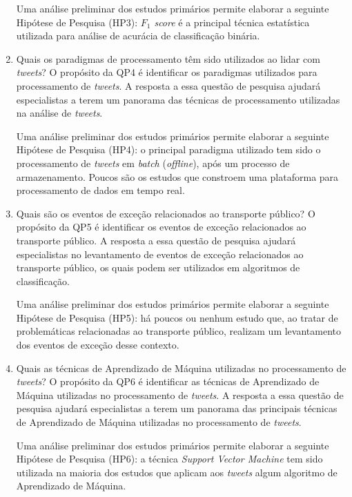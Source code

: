 \documentclass[
	12pt,				%
	oneside,			%
	a4paper,			%
	english,			%
	brazil				%
	]{abntex2ppgsi}
\begin{document}
\begin{enumerate}
Uma análise preliminar dos estudos primários permite elaborar a seguinte Hipótese de Pesquisa (HP3): \textit{${F_1}$ score} é a principal técnica estatística utilizada para análise de acurácia de classificação binária.\newline

\item Quais os paradigmas de processamento têm sido utilizados ao lidar com \textit{tweets}?
\label{item:4} \newline \newline
O propósito da QP4 é identificar os paradigmas utilizados para processamento de \textit{tweets}. A resposta a essa questão de pesquisa ajudará especialistas a terem um panorama das técnicas de processamento utilizadas na análise de \textit{tweets}. \newline

Uma análise preliminar dos estudos primários permite elaborar a seguinte Hipótese de Pesquisa (HP4): o principal paradigma utilizado tem sido o processamento de \textit{tweets} em \textit{batch} (\textit{offline}), após um processo de armazenamento. Poucos são os estudos que constroem uma plataforma para processamento de dados em tempo real. \newline

\item Quais são os eventos de exceção relacionados ao transporte público?
\label{item:5} \newline \newline
O propósito da QP5 é identificar os eventos de exceção relacionados ao transporte público. A resposta a essa questão de pesquisa ajudará especialistas no levantamento de eventos de exceção relacionados ao transporte público, os quais podem ser utilizados em algoritmos de classificação.\newline

Uma análise preliminar dos estudos primários permite elaborar a seguinte Hipótese de Pesquisa (HP5): há poucos ou nenhum estudo que, ao tratar de problemáticas relacionadas ao transporte público, realizam um levantamento dos eventos de exceção desse contexto.\newline

\item Quais as técnicas de Aprendizado de Máquina utilizadas no processamento de \textit{tweets}?
\label{item:6} \newline \newline
O propósito da QP6 é identificar as técnicas de Aprendizado de Máquina utilizadas no processamento de \textit{tweets}. A resposta a essa questão de pesquisa ajudará especialistas a terem um panorama das principais técnicas de Aprendizado de Máquina utilizadas no processamento de \textit{tweets}. \newline

Uma análise preliminar dos estudos primários permite elaborar a seguinte Hipótese de Pesquisa (HP6): a técnica \textit{Support Vector Machine} tem sido utilizada na maioria dos estudos que aplicam aos \textit{tweets} algum algoritmo de Aprendizado de Máquina.\newline
\end{enumerate}
\end{document}
